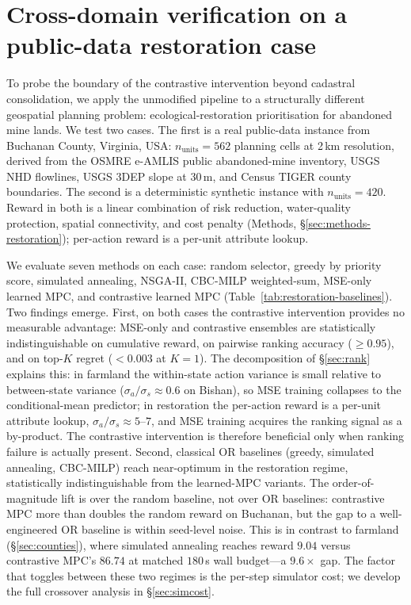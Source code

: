 \documentclass[11pt]{article}
\begin{document}
\section{Cross-domain verification on a public-data restoration case}\label{sec:cross-domain}

To probe the boundary of the contrastive intervention beyond cadastral consolidation, we apply the unmodified pipeline to a structurally different geospatial planning problem: ecological-restoration prioritisation for abandoned mine lands. We test two cases. The first is a real public-data instance from Buchanan County, Virginia, USA: $n_{\text{units}}=562$ planning cells at 2\,km resolution, derived from the OSMRE e-AMLIS public abandoned-mine inventory, USGS NHD flowlines, USGS 3DEP slope at 30\,m, and Census TIGER county boundaries. The second is a deterministic synthetic instance with $n_{\text{units}}=420$. Reward in both is a linear combination of risk reduction, water-quality protection, spatial connectivity, and cost penalty (Methods, \S\ref{sec:methods-restoration}); per-action reward is a per-unit attribute lookup.

We evaluate seven methods on each case: random selector, greedy by priority score, simulated annealing, NSGA-II, CBC-MILP weighted-sum, MSE-only learned MPC, and contrastive learned MPC (Table~\ref{tab:restoration-baselines}). Two findings emerge. First, on both cases the contrastive intervention provides no measurable advantage: MSE-only and contrastive ensembles are statistically indistinguishable on cumulative reward, on pairwise ranking accuracy ($\geq 0.95$), and on top-$K$ regret ($< 0.003$ at $K{=}1$). The decomposition of \S\ref{sec:rank} explains this: in farmland the within-state action variance is small relative to between-state variance ($\sigma_a / \sigma_s \approx 0.6$ on Bishan), so MSE training collapses to the conditional-mean predictor; in restoration the per-action reward is a per-unit attribute lookup, $\sigma_a / \sigma_s \approx 5\text{--}7$, and MSE training acquires the ranking signal as a by-product. The contrastive intervention is therefore beneficial only when ranking failure is actually present. Second, classical OR baselines (greedy, simulated annealing, CBC-MILP) reach near-optimum in the restoration regime, statistically indistinguishable from the learned-MPC variants. The order-of-magnitude lift is over the random baseline, not over OR baselines: contrastive MPC more than doubles the random reward on Buchanan, but the gap to a well-engineered OR baseline is within seed-level noise. This is in contrast to farmland (\S\ref{sec:counties}), where simulated annealing reaches reward $9.04$ versus contrastive MPC's $86.74$ at matched $180$\,s wall budget---a $9.6\times$ gap. The factor that toggles between these two regimes is the per-step simulator cost; we develop the full crossover analysis in \S\ref{sec:simcost}.
\end{document}

